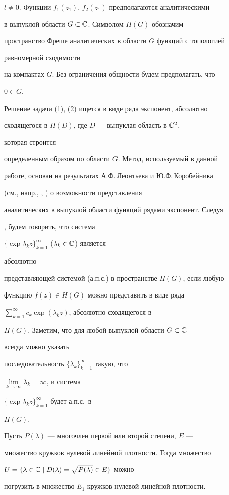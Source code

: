 $l\ne 0$. Функции $f_1(z_1)$, $f_2(z_1)$ предполагаются аналитическими 


в выпуклой области $G\subset\Bbb C$. Символом $H(G)$ обозначим 


пространство Фреше аналитических в области $G$ функций с топологией 


равномерной сходимости 


на компактах $G$. Без ограничения общности будем предполагать, что 


$0\in G$. 


 


Решение задачи (1), (2) ищется в виде ряда экспонент, абсолютно 


сходящегося в $H(D)$, где $D$ --- выпуклая область в $\Bbb C^2$, 


которая строится 


определенным образом по области $G$. Метод, используемый в данной 


работе, основан на результатах А.Ф.\,Леонтьева и Ю.Ф.\,Коробейника 


(см., напр., \cite{1}, \cite{2}) о возможности представления 


аналитических в выпуклой области функций рядами экспонент. Следуя 


\cite{3}, будем говорить, что система 


$\{\exp\lambda_k z\}^\infty_{k=1}$ ($\lambda_k\in\Bbb C$) является 


абсолютно 


представляющей системой (а.п.с.) в пространстве $H(G)$, если любую 


функцию $f(z)\in H(G)$ можно представить в виде ряда 


$\sum\limits^\infty_{k=1}c_k\exp(\lambda_k z)$, абсолютно сходящегося в 


$H(G)$. Заметим, что для любой выпуклой области $G\subset\Bbb C$ 


всегда можно указать 


последовательность $\{\lambda_k\}^\infty_{k=1}$ такую, что 


$\lim\limits_{k\to\infty}\lambda_k=\infty$, и система 


$\{\exp\lambda_k z\}^\infty_{k=1}$ будет а.п.с.~в 


$H(G)$. 


 


\begin{lemnonum} 


Пусть $P(\lambda)$ --- многочлен первой или второй степени, $E$ --- 


множество кружков нулевой линейной плотности. Тогда множество 


$U=\{\lambda\in\Bbb C\mid D(\lambda)=\sqrt{P(\lambda)}\in E\}$ можно 


погрузить в множество $E_1$ кружков нулевой линейной плотности. 


\end{lemnonum} 


